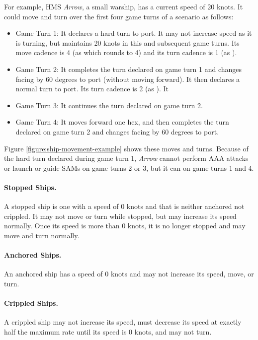 {For example, HMS {\itshape Arrow}, a small warship, has a current speed of 20 knots. It could move and turn over the first four game turns of a scenario as follows:
\begin{itemize}
\item Game Turn 1:  It declares a hard turn to port. It may not increase speed as it is turning, but maintains 20 knots in this and subsequent game turns. Its move cadence is 4 (as  which rounds to 4) and its turn cadence is 1 (as ).
\item Game Turn 2: It completes the turn declared on game turn 1 and changes facing by 60 degrees to port (without moving forward). It then declares a normal turn to port. Its turn cadence is 2 (as ). It 
\item Game Turn 3: It continues the turn declared on game turn 2.
\item Game Turn 4: It moves forward one hex, and then completes the turn declared on game turn 2 and changes facing by 60 degrees to port.
\end{itemize}
Figure \ref{figure:ship-movement-example} shows these moves and turns. Because of the hard turn declared during game turn 1, {\itshape Arrow} cannot perform AAA attacks or launch or guide SAMs on game turns 2 or 3, but it can on game turns 1 and 4.


\paragraph{Stopped Ships.} A stopped ship is one with a speed of 0 knots and that is neither anchored not crippled. It may not move or turn while stopped, but may increase its speed normally. Once its speed is more than 0 knots, it is no longer stopped and may move and turn normally.

\paragraph{Anchored Ships.} An anchored ship has a speed of 0 knots and may not increase its speed, move, or turn.

\paragraph{Crippled Ships.} A crippled ship may not increase its speed, must decrease its speed at exactly half the maximum rate until its speed is 0 knots, and may not turn.

}

